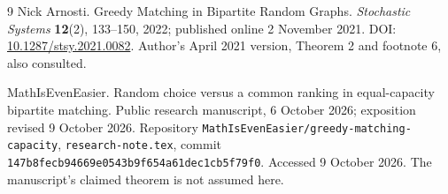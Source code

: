 \begin{thebibliography}{9}
Nick Arnosti.
\newblock Greedy Matching in Bipartite Random Graphs.
\newblock \emph{Stochastic Systems} \textbf{12}(2), 133--150, 2022; published online 2 November 2021.
\newblock DOI: \href{https://doi.org/10.1287/stsy.2021.0082}{10.1287/stsy.2021.0082}.
\newblock Author's April 2021 version, Theorem 2 and footnote 6, also consulted.

MathIsEvenEasier.
\newblock Random choice versus a common ranking in equal-capacity bipartite matching.
\newblock Public research manuscript, 6 October 2026; exposition revised 9 October 2026.
\newblock Repository \texttt{MathIsEvenEasier/greedy-matching-capacity},
\texttt{research-note.tex}, commit
\texttt{147b8fecb94669e0543b9f654a61dec1cb5f79f0}.
\newblock Accessed 9 October 2026. The manuscript's claimed theorem is not assumed here.
\end{thebibliography}

